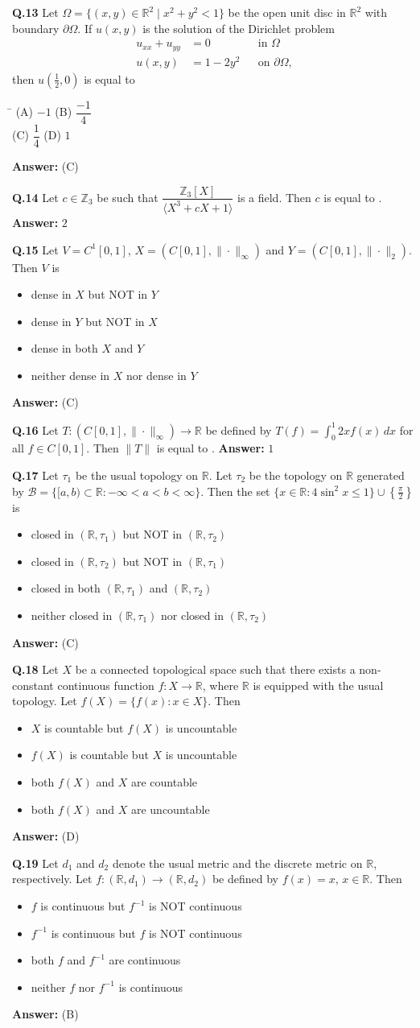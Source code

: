 \documentclass[11pt,a4paper]{article}
\newcommand{\optsfourA}[4]{%
  \begin{tabbing}
    \hspace{0.48\linewidth}\=\kill
    (A) #1 \> (B) #2 \\[2pt]
    (C) #3 \> (D) #4
  \end{tabbing}%
}
\newcommand{\optslistA}[4]{%
  \begin{itemize}
    \setlength{\itemsep}{2pt}\setlength{\parskip}{0pt}
    \item[(A)] #1
    \item[(B)] #2
    \item[(C)] #3
    \item[(D)] #4
  \end{itemize}%
}
\newcommand{\ans}[1]{\textbf{Answer:} #1\par\medskip}
\begin{document}
\textbf{Q.13} Let $\Omega = \{(x, y) \in \mathbb{R}^2 \mid x^2 + y^2 < 1\}$ be the open unit disc in $\mathbb{R}^2$ with boundary $\partial\Omega$. If $u(x, y)$ is the solution of the Dirichlet problem
\begin{align*}
  u_{xx} + u_{yy} &= 0 && \text{in } \Omega \\
  u(x, y) &= 1 - 2y^2 && \text{on } \partial\Omega,
\end{align*}
then $u\!\left(\frac{1}{2}, 0\right)$ is equal to
\optsfourA{$-1$}{$\dfrac{-1}{4}$}{$\dfrac{1}{4}$}{$1$}
\ans{(C)}

\textbf{Q.14} Let $c \in \mathbb{Z}_3$ be such that $\dfrac{\mathbb{Z}_3[X]}{\langle X^3 + cX + 1 \rangle}$ is a field. Then $c$ is equal to \underline{\hspace{2cm}}.
\ans{$2$}

\textbf{Q.15} Let $V = C^1[0, 1]$, $X = (C[0, 1], \|\cdot\|_\infty)$ and $Y = (C[0, 1], \|\cdot\|_2)$. Then $V$ is
\optslistA{dense in $X$ but NOT in $Y$}{dense in $Y$ but NOT in $X$}{dense in both $X$ and $Y$}{neither dense in $X$ nor dense in $Y$}
\ans{(C)}

\textbf{Q.16} Let $T : (C[0, 1], \|\cdot\|_\infty) \to \mathbb{R}$ be defined by $T(f) = \int_0^1 2x f(x)\,dx$ for all $f \in C[0, 1]$. Then $\|T\|$ is equal to \underline{\hspace{2cm}}.
\ans{$1$}

\textbf{Q.17} Let $\tau_1$ be the usual topology on $\mathbb{R}$. Let $\tau_2$ be the topology on $\mathbb{R}$ generated by $\mathcal{B} = \{[a, b) \subset \mathbb{R} : -\infty < a < b < \infty\}$. Then the set $\{x \in \mathbb{R} : 4\sin^2 x \le 1\} \cup \left\{\frac{\pi}{2}\right\}$ is
\optslistA{closed in $(\mathbb{R}, \tau_1)$ but NOT in $(\mathbb{R}, \tau_2)$}{closed in $(\mathbb{R}, \tau_2)$ but NOT in $(\mathbb{R}, \tau_1)$}{closed in both $(\mathbb{R}, \tau_1)$ and $(\mathbb{R}, \tau_2)$}{neither closed in $(\mathbb{R}, \tau_1)$ nor closed in $(\mathbb{R}, \tau_2)$}
\ans{(C)}

\textbf{Q.18} Let $X$ be a connected topological space such that there exists a non-constant continuous function $f : X \to \mathbb{R}$, where $\mathbb{R}$ is equipped with the usual topology. Let $f(X) = \{f(x) : x \in X\}$. Then
\optslistA{$X$ is countable but $f(X)$ is uncountable}{$f(X)$ is countable but $X$ is uncountable}{both $f(X)$ and $X$ are countable}{both $f(X)$ and $X$ are uncountable}
\ans{(D)}

\textbf{Q.19} Let $d_1$ and $d_2$ denote the usual metric and the discrete metric on $\mathbb{R}$, respectively. Let $f : (\mathbb{R}, d_1) \to (\mathbb{R}, d_2)$ be defined by $f(x) = x$, $x \in \mathbb{R}$. Then
\optslistA{$f$ is continuous but $f^{-1}$ is NOT continuous}{$f^{-1}$ is continuous but $f$ is NOT continuous}{both $f$ and $f^{-1}$ are continuous}{neither $f$ nor $f^{-1}$ is continuous}
\ans{(B)}
\end{document}
